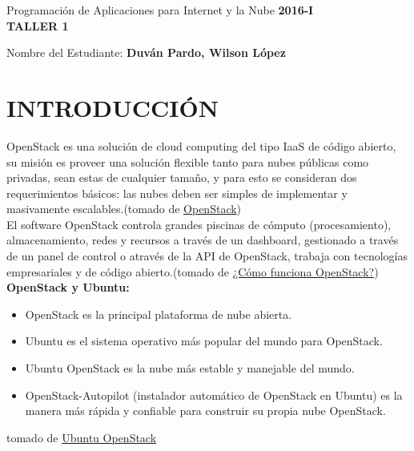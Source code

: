 \documentclass[10pt]{article}   			%
\begin{document}
	\renewcommand{\headrulewidth}{0.5pt}

	\thispagestyle{empty}						%
	\begin{center}
		\large {Programación de Aplicaciones para Internet y la Nube
			\hspace{5 cm}\textbf{2016-I}}
		\bigskip  
		\textbf{
				\LARGE{\\TALLER 1}}\\								%
	\end{center}	
	\begin{flushright}	
		\bigskip	
		Nombre del Estudiante: \textbf{Duván Pardo, Wilson López}			%
	\end{flushright} 
\section{INTRODUCCIÓN}	
OpenStack es una solución de cloud computing del tipo IaaS de código abierto, su misión es proveer una solución flexible tanto para nubes públicas como privadas, sean estas de cualquier tamaño, y para esto se consideran dos requerimientos básicos: las nubes deben ser simples de implementar y masivamente escalables.(tomado de \href{https://www.openstack.org/}{OpenStack})\\


El software OpenStack controla grandes piscinas de cómputo (procesamiento), almacenamiento, redes y recursos a través de un dashboard, gestionado a través de un panel de control o através de la API de OpenStack, trabaja con tecnologías empresariales y de código abierto.(tomado de \href{http://vmartinezdelacruz.com/en-pocas-palabras-como-funciona-openstack/}{¿Cómo funciona OpenStack?})\\


\textbf{OpenStack y Ubuntu:}
\begin{itemize}
\item OpenStack es la principal plataforma de nube abierta.	
\item Ubuntu es el sistema operativo más popular del mundo para OpenStack.
\item Ubuntu OpenStack es la nube más estable y manejable del mundo.
\item OpenStack-Autopilot (instalador automático de OpenStack en Ubuntu) es la manera más rápida y confiable para construir su propia nube OpenStack.
\end{itemize}
tomado de \href{http://www.ubuntu.com/cloud/openstack
	}{Ubuntu OpenStack}
\end{document}
